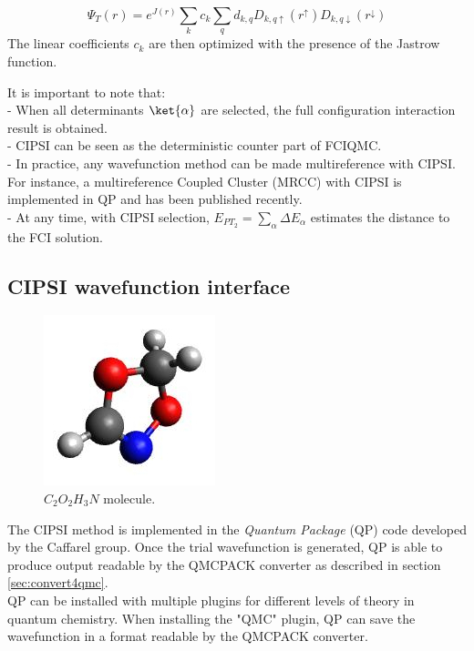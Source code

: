 \begin{equation}
\Psi_T(r)=e^{J(r)}\sum_k c_k \sum_q d_{k,q}D_{k,q\uparrow } (r^{\uparrow})D_{k,q\downarrow}(r^{\downarrow})
\end{equation}
The linear coefficients $c_k$ are then optimized with the presence of the Jastrow function. 

It is important to note that:\\
- When all determinants $\ket{\alpha}$ are selected, the full configuration interaction result is obtained.\\
- CIPSI can be seen as the deterministic counter part of FCIQMC. \\
- In practice, any wavefunction method can be made multireference with CIPSI. For instance, a multireference Coupled Cluster (MRCC) with CIPSI is implemented in QP and has been published recently.\cite{Garniron2017}\\
- At any time, with CIPSI selection, $E_{PT_2}=\sum_\alpha \Delta E_\alpha$ estimates the distance to the FCI solution.



\subsection{CIPSI wavefunction interface}
\label{sec:cipsi}


\begin{figure}
\begin{center}
\includegraphics[trim = 0mm 0mm 0mm 0mm, clip,width=0.3\columnwidth]{figures/Reactant.jpg}
\end{center}
\caption{$C_2O_2H_3N$ molecule.
\label{fig:C2O2H3N}
}
\end{figure}
The CIPSI method
is implemented in the \textit{Quantum Package} (QP) code\cite{QP} developed by the Caffarel group. Once the trial wavefunction is generated, QP is able to produce output readable by the QMCPACK converter as described in section \ref{sec:convert4qmc}.\\
QP can be installed with multiple plugins for different levels of theory in quantum chemistry. When installing the "QMC" plugin, QP can save the wavefunction in a format readable by the QMCPACK converter. \\

